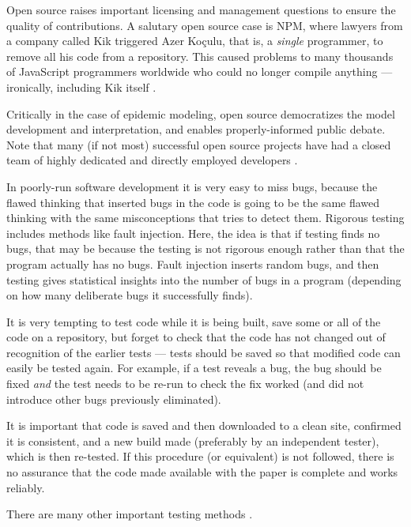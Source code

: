 \documentclass[10pt,a4paper]{article}
\begin{document}
Open source raises important licensing and management questions to ensure the quality of contributions. A salutary open source case is NPM, where lawyers from a company called Kik triggered Azer Ko\c{c}ulu, that is, a \emph{single\/} programmer, to remove all his code from a repository. This caused problems to many thousands of JavaScript programmers worldwide who could no longer compile anything --- ironically, including Kik itself \cite{npm}. 

Critically in the case of epidemic modeling, open source democratizes the model development and interpretation, and enables properly-informed public debate. Note that many (if not most) successful open source projects have had a closed team of highly dedicated and directly employed developers \cite{open-source}. 

In poorly-run software development it is very easy to miss bugs, because the flawed thinking that inserted bugs in the code is going to be the same flawed thinking with the same misconceptions that tries to detect them. Rigorous testing includes methods like fault injection. Here, the idea is that if testing finds no bugs, that may be because the testing is not rigorous enough rather than that the program actually has no bugs. Fault injection inserts random bugs, and then testing gives statistical insights into the number of bugs in a program (depending on how many deliberate bugs it successfully finds). 

It is very tempting to test code while it is being built, save some or all of the code on a repository, but forget to check that the code has not changed out of recognition of the earlier tests --- tests should be saved so that modified code can easily be tested again. For example, if a test reveals a bug, the bug should be fixed \emph{and\/} the test needs to be re-run to check the fix worked (and did not introduce other bugs previously eliminated). 

It is important that code is saved and then downloaded to a clean site, confirmed it is consistent, and a new build made (preferably by an independent tester), which is then re-tested. If this procedure (or equivalent) is not followed, there is no assurance that the code made available with the paper is complete and works reliably.

There are many other important testing methods \cite{sommerville,knight,NVP}.
\end{document}
